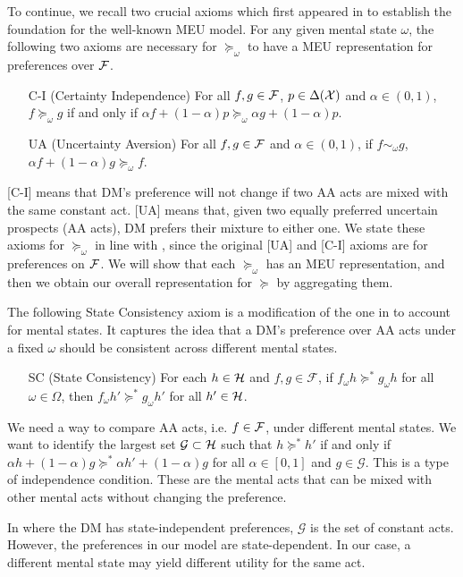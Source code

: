 \documentclass[11pt,oneside]{article}
\theoremstyle{plain}
\theoremstyle{plain}
\theoremstyle{plain}
\theoremstyle{plain}
\theoremstyle{plain}
\theoremstyle{definition}
\theoremstyle{definition}
\theoremstyle{remark}
\theoremstyle{plain}
\newcommand{\F}{{\cal F}}
\newcommand{\pfo}{\pf_\omega}
\newcommand{\mcx}{{\cal X}}
\newcommand{\pf}{\succeq}
\newcommand{\pfs}{\succeq^*}
\newcommand{\convmix}[2]{\alpha #1 + (1-\alpha) #2}
\newcommand{\omix}[2]{#1_\omega #2 }
\begin{document}
To continue, we recall two crucial axioms which first appeared in \cite{gilboa1989maxmin} to establish the foundation for the well-known MEU model.
For any given mental state $\omega$, the following two axioms are necessary for $\pf_\omega$ to have a MEU representation for preferences over $\F$.
%
\begin{itemize}
    \item [C-I] (Certainty Independence) For all $f,g \in \F$, $p \in \Delta(\mcx)$ and $\alpha \in (0,1)$, $f \pf_\omega g$ if and only if
    $\convmix{f}{p} \pf_\omega \convmix{g}{p}.$
    \item [UA] (Uncertainty Aversion) For all $f,g \in \F$ and $\alpha \in (0,1)$, if $f \sim_\omega g$, $\convmix{f}{g} \pf_\omega f$.
\end{itemize}
%
[C-I] means that DM's preference will not change if two AA acts are mixed with the same constant act. [UA] means that, given two equally preferred uncertain prospects (AA acts), DM prefers their mixture to either one.
We state these axioms for $\pfo$ in line with \cite{gilboa1989maxmin}, since the original [UA] and [C-I] axioms are for preferences on $\F$. We will show that each $\pfo$ has an MEU representation, and then we obtain our overall representation for $\pf$ by aggregating them. 

The following State Consistency axiom is a modification of the one in \cite{hill2019non} to account for mental states. It captures the idea that a DM's preference over AA acts under a fixed $\omega$ should be consistent across different mental states.

%
\begin{itemize}
    \item [SC] (State Consistency) For each $h \in {\cal H}$ and $f,g \in \mathcal{F}$, if $\omix{f}{h}\pfs \omix{g}{h}$ for all $\omega \in \Omega$, then $\omix{f}{h'} \pfs \omix{g}{h'}$ for all $h' \in {\cal H}$.
\end{itemize}
%

We need a way to compare AA acts, i.e. $f\in \F$, under different mental states.
We want to identify the largest set $\mathcal{G} \subset {\cal H}$ such that $h \pfs h'$ if and only if $\alpha h + (1-\alpha) g \pfs \alpha h' + (1-\alpha) g$ for all $\alpha \in [0,1]$ and $g \in \mathcal{G}$.
This is a type of independence condition.
These are the mental acts that can be mixed with other mental acts without changing the preference.

In \cite{gilboa1989maxmin} where the DM has state-independent preferences, $\mathcal{G}$ is the set of constant acts.
However, the preferences in our model are state-dependent. In our case, a different mental state may yield different utility for the same act.
\end{document}
